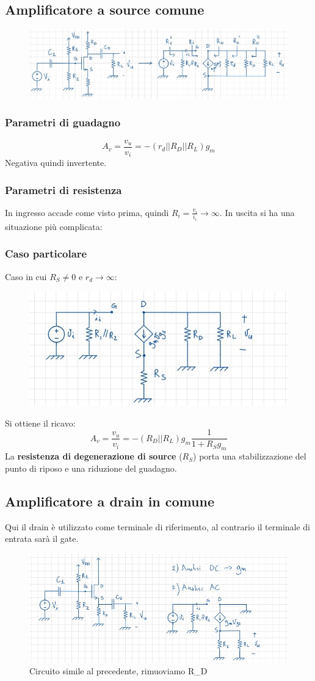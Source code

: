\documentclass[11pt,a4paper,]{article}
\begin{document}
\subsection{Amplificatore a source comune}
\begin{figure}[H]   
    \centering
    \includegraphics[width=0.5\linewidth]{img/amp source comune.png}
\end{figure}
\subsubsection{Parametri di guadagno}
\[
A_v = \frac{v_u}{v_i} = -(r_d || R_D || R_L)g_m
\]
Negativa quindi invertente.
\subsubsection{Parametri di resistenza}
In ingresso accade come visto prima, quindi $R_i= \frac{v_i}{i_i}\to\infty$.
In uscita si ha una situazione più complicata:
\subsubsection{Caso particolare}
Caso in cui $R_S\neq 0$ e $r_d\to\infty$:
\begin{figure}[H]
    \centering
    \includegraphics[width=0.25\linewidth]{img/caso part.png}
\end{figure}
Si ottiene il ricavo:
\[
A_v = \frac{v_u}{v_i} = -(R_D||R_L)g_m \frac{1}{1 + R_S g_m}
\]
La \textbf{resistenza di degenerazione di source} ($R_S$) porta una stabilizzazione del punto di riposo e una riduzione del guadagno.

\subsection{Amplificatore a drain in comune}
Qui il drain è utilizzato come terminale di riferimento, al contrario il terminale di entrata sarà il gate.
\begin{figure}
    \centering
    \includegraphics[width=0.5\linewidth]{img/amp drain com.png}
    \caption{Circuito simile al precedente, rimuoviamo R\_D}
\end{figure}
\end{document}
